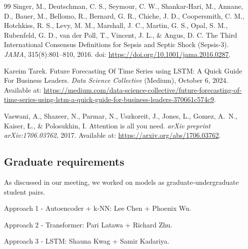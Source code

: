 \documentclass{article}
\theoremstyle{plain}
\theoremstyle{definition}
\theoremstyle{remark}
\begin{document}
\begin{thebibliography}{99}
Singer, M., Deutschman, C. S., Seymour, C. W., Shankar-Hari, M., Annane, D., Bauer, M., Bellomo, R., Bernard, G. R., Chiche, J. D., Coopersmith, C. M., Hotchkiss, R. S., Levy, M. M., Marshall, J. C., Martin, G. S., Opal, S. M., Rubenfeld, G. D., van der Poll, T., Vincent, J. L., \& Angus, D. C.
\newblock The Third International Consensus Definitions for Sepsis and Septic Shock (Sepsis-3).
\newblock \emph{JAMA}, 315(8):801--810, 2016.
\newblock doi: \url{https://doi.org/10.1001/jama.2016.0287}.

Kareim Tarek.
\newblock Future Forecasting Of Time Series using LSTM: A Quick Guide For Business Leaders.
\newblock \emph{Data Science Collective} (Medium), October 6, 2024.
\newblock Available at: \url{https://medium.com/data-science-collective/future-forecasting-of-time-series-using-lstm-a-quick-guide-for-business-leaders-370661c574c9}.

Vaswani, A., Shazeer, N., Parmar, N., Uszkoreit, J., Jones, L., Gomez, A.~N., Kaiser, Ł., \& Polosukhin, I.
\newblock Attention is all you need.
\newblock \emph{arXiv preprint arXiv:1706.03762}, 2017.
\newblock Available at: \url{https://arxiv.org/abs/1706.03762}.

\end{thebibliography}

\subsection{Graduate requirements}
As discussed in our meeting, we worked on models as graduate-undergraduate student pairs. 

Approach 1 - Autoencoder + k-NN: Lee Chen + Phoenix Wu. 

Approach 2 - Transformer: Pari Latawa + Richard Zhu. 

Approach 3 - LSTM: Shauna Kwag + Samir Kadariya. 
\end{document}
